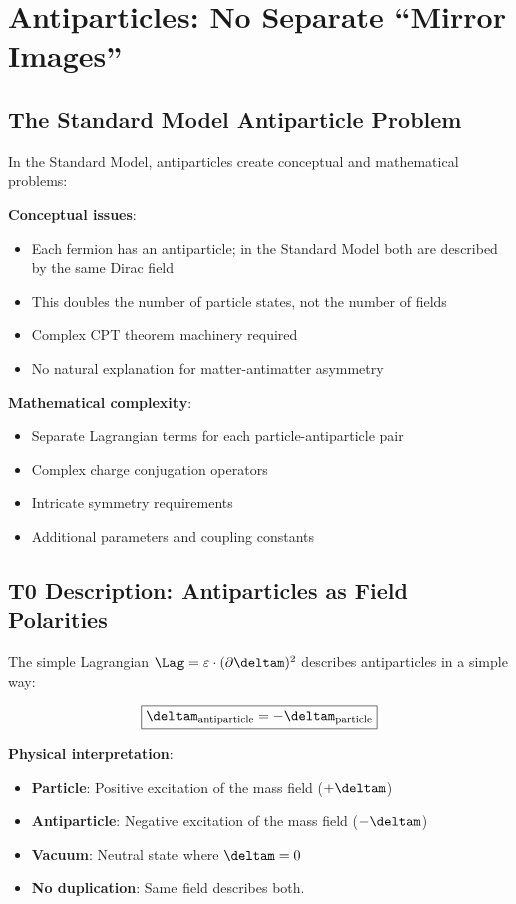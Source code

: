 	\section{Antiparticles: No Separate ``Mirror Images''}
	
	\subsection{The Standard Model Antiparticle Problem}
	
	In the Standard Model, antiparticles create conceptual and mathematical problems:
	
	\textbf{Conceptual issues}:
	\begin{itemize}
		\item Each fermion has an antiparticle; in the Standard Model both are described by the same Dirac field
		\item This doubles the number of particle states, not the number of fields
		\item Complex CPT theorem machinery required
		\item No natural explanation for matter-antimatter asymmetry
	\end{itemize}
	
	\textbf{Mathematical complexity}:
	\begin{itemize}
		\item Separate Lagrangian terms for each particle-antiparticle pair
		\item Complex charge conjugation operators
		\item Intricate symmetry requirements
		\item Additional parameters and coupling constants
	\end{itemize}
	
	\subsection{T0 Description: Antiparticles as Field Polarities}
	
	The simple Lagrangian $\Lag = \varepsilon \cdot (\partial \deltam)^2$ describes antiparticles in a simple way:
	
	\begin{equation}
		\boxed{\deltam_{\text{antiparticle}} = -\deltam_{\text{particle}}}
		\label{eq:antiparticle_solution}
	\end{equation}
	
	\textbf{Physical interpretation}:
	\begin{itemize}
		\item \textbf{Particle}: Positive excitation of the mass field ($+\deltam$)
		\item \textbf{Antiparticle}: Negative excitation of the mass field ($-\deltam$)  
		\item \textbf{Vacuum}: Neutral state where $\deltam = 0$
		\item \textbf{No duplication}: Same field describes both.
	\end{itemize}
	

